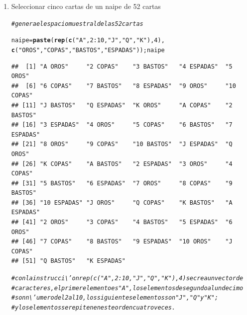 \documentclass[12pt,letterpaper]{article}\usepackage[]{graphicx}\usepackage[]{color}
\makeatletter
\newcommand{\hlnum}[1]{\textcolor[rgb]{0.686,0.059,0.569}{#1}}%
\newcommand{\hlstr}[1]{\textcolor[rgb]{0.192,0.494,0.8}{#1}}%
\newcommand{\hlcom}[1]{\textcolor[rgb]{0.678,0.584,0.686}{\textit{#1}}}%
\newcommand{\hlopt}[1]{\textcolor[rgb]{0,0,0}{#1}}%
\newcommand{\hlstd}[1]{\textcolor[rgb]{0.345,0.345,0.345}{#1}}%
\newcommand{\hlkwb}[1]{\textcolor[rgb]{0.69,0.353,0.396}{#1}}%
\newcommand{\hlkwd}[1]{\textcolor[rgb]{0.737,0.353,0.396}{\textbf{#1}}}%
\newenvironment{kframe}{%
 \def\at@end@of@kframe{}%
 \ifinner\ifhmode%
  \def\at@end@of@kframe{\end{minipage}}%
  \begin{minipage}{\columnwidth}%
 \fi\fi%
 \def\FrameCommand##1{\hskip\@totalleftmargin \hskip-\fboxsep
 \colorbox{shadecolor}{##1}\hskip-\fboxsep
     \hskip-\linewidth \hskip-\@totalleftmargin \hskip\columnwidth}%
 \MakeFramed {\advance\hsize-\width
   \@totalleftmargin\z@ \linewidth\hsize
   \@setminipage}}%
 {\par\unskip\endMakeFramed%
 \at@end@of@kframe}
\newenvironment{knitrout}{}{} %
\makeatother
\begin{document}
\begin{enumerate}
\item  Seleccionar cinco cartas de un naipe de 52 cartas

\begin{knitrout}
\color{fgcolor}\begin{kframe}
\begin{alltt}
\hlcom{#genera el espacio muestral de las 52 cartas }

\hlstd{naipe} \hlkwb{=} \hlkwd{paste}\hlstd{(}\hlkwd{rep}\hlstd{(}\hlkwd{c}\hlstd{(}\hlstr{"A"}\hlstd{,} \hlnum{2}\hlopt{:}\hlnum{10}\hlstd{,} \hlstr{"J"}\hlstd{,} \hlstr{"Q"}\hlstd{,} \hlstr{"K"}\hlstd{),} \hlnum{4}\hlstd{),}
              \hlkwd{c}\hlstd{(}\hlstr{"OROS"}\hlstd{,}\hlstr{"COPAS"}\hlstd{,} \hlstr{"BASTOS"}\hlstd{,} \hlstr{"ESPADAS"}\hlstd{));naipe}
\end{alltt}
\begin{verbatim}
##  [1] "A OROS"     "2 COPAS"    "3 BASTOS"   "4 ESPADAS"  "5 OROS"    
##  [6] "6 COPAS"    "7 BASTOS"   "8 ESPADAS"  "9 OROS"     "10 COPAS"  
## [11] "J BASTOS"   "Q ESPADAS"  "K OROS"     "A COPAS"    "2 BASTOS"  
## [16] "3 ESPADAS"  "4 OROS"     "5 COPAS"    "6 BASTOS"   "7 ESPADAS" 
## [21] "8 OROS"     "9 COPAS"    "10 BASTOS"  "J ESPADAS"  "Q OROS"    
## [26] "K COPAS"    "A BASTOS"   "2 ESPADAS"  "3 OROS"     "4 COPAS"   
## [31] "5 BASTOS"   "6 ESPADAS"  "7 OROS"     "8 COPAS"    "9 BASTOS"  
## [36] "10 ESPADAS" "J OROS"     "Q COPAS"    "K BASTOS"   "A ESPADAS" 
## [41] "2 OROS"     "3 COPAS"    "4 BASTOS"   "5 ESPADAS"  "6 OROS"    
## [46] "7 COPAS"    "8 BASTOS"   "9 ESPADAS"  "10 OROS"    "J COPAS"   
## [51] "Q BASTOS"   "K ESPADAS"
\end{verbatim}
\end{kframe}
\end{knitrout}

\begin{knitrout}
\color{fgcolor}\begin{kframe}
\begin{alltt}
\hlcom{# con la instrucci\textbackslash{}'on rep(c("A", 2:10, "J", "Q", "K"), 4) se crea un vector de}
\hlcom{# caracteres, el primer elemento es "A", los elementos de segundo al undecimo }
\hlcom{# son n\textbackslash{}'umero del 2 al 10, los siguientes elementos son "J", "Q" y "K"; }
\hlcom{# y los elementos se repiten en este orden cuatro veces. }
\end{alltt}
\end{kframe}
\end{knitrout}


\end{enumerate}
\end{document}

